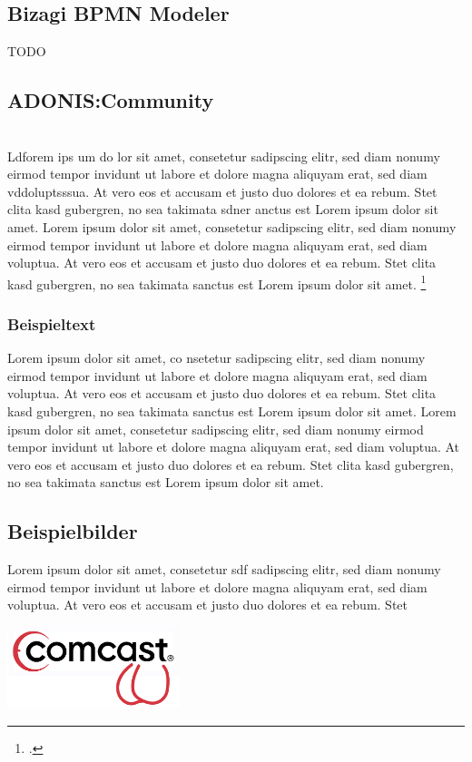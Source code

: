 \subsection{Bizagi BPMN Modeler}
TODO
\subsection{ADONIS:Community}



 \\
Ldforem ips um do lor sit amet, consetetur sadipscing elitr, \label{Referenz}
sed diam  nonumy eirmod tempor invidunt ut labore et dolore magna aliquyam erat,
sed diam vddoluptsssua. At vero eos et accusam et justo duo dolores et ea rebum.
Stet clita kasd gubergren, no sea takimata sdner anctus est Lorem ipsum dolor sit amet. Lorem ipsum dolor sit amet, consetetur sadipscing elitr, sed diam nonumy eirmod tempor invidunt ut labore et dolore magna aliquyam erat, sed diam voluptua. At vero eos et accusam et justo duo dolores et ea rebum. Stet clita kasd gubergren, no sea takimata sanctus est Lorem ipsum dolor sit amet.
\footcite[Vgl.][Experto.de, Artikel über das und jenes]{praxishandbuch:bpmn2}
\subsubsection{Beispieltext}
Lorem ipsum dolor sit amet, co nsetetur sadipscing elitr, sed diam
nonumy eirmod tempor invidunt ut labore et dolore magna aliquyam erat, sed diam voluptua. At vero eos et accusam et justo duo dolores et ea rebum. Stet clita kasd gubergren, no sea takimata sanctus est Lorem ipsum dolor sit amet. Lorem ipsum dolor sit amet, consetetur sadipscing elitr, sed diam nonumy eirmod tempor invidunt ut labore et dolore magna aliquyam erat, sed diam voluptua. At vero eos et accusam et justo duo dolores et ea rebum. Stet clita kasd gubergren, no sea takimata sanctus est Lorem ipsum dolor sit amet.

\clearpage

\subsection{Beispielbilder}
Lorem ipsum dolor sit amet, consetetur  sdf sadipscing elitr, sed diam nonumy eirmod tempor invidunt ut labore et dolore magna aliquyam erat, sed diam voluptua. At vero eos et accusam et justo duo dolores et ea rebum. Stet

\begin{center}
	\includegraphics[width=5cm]{images/company_logo.png}
\end{center}

